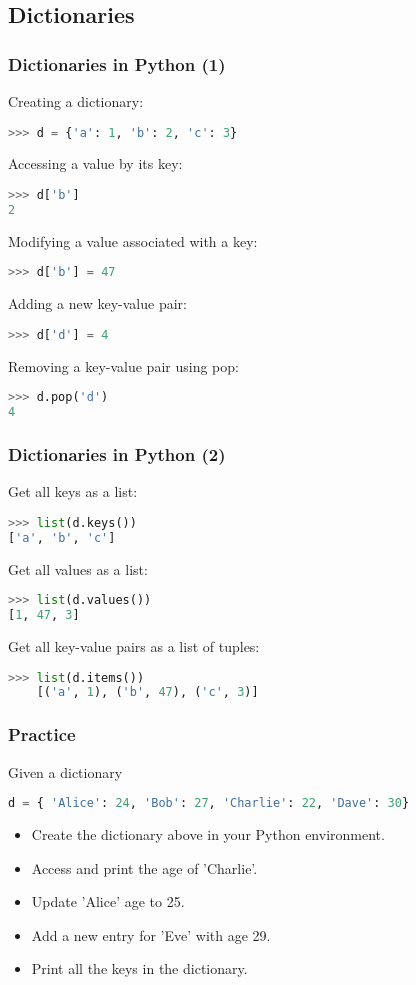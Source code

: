 \subsection{Dictionaries}
\begin{frame}[fragile]
  \frametitle{Dictionaries in Python (1)}
  Creating a dictionary:
  \begin{lstlisting}[language=Python,numbers=none]
>>> d = {'a': 1, 'b': 2, 'c': 3}
  \end{lstlisting}\pause
  Accessing a value by its key:
  \begin{lstlisting}[language=Python,numbers=none]
>>> d['b']
2
  \end{lstlisting}\pause
  Modifying a value associated with a key:
  \begin{lstlisting}[language=Python,numbers=none]
>>> d['b'] = 47
  \end{lstlisting}\pause
  Adding a new key-value pair:
  \begin{lstlisting}[language=Python,numbers=none]
>>> d['d'] = 4
  \end{lstlisting}\pause
  Removing a key-value pair using pop:
  \begin{lstlisting}[language=Python,numbers=none]
>>> d.pop('d')
4
  \end{lstlisting}
\end{frame}

\begin{frame}[fragile]
  \frametitle{Dictionaries in Python (2)}
  Get all keys as a list:
  \begin{lstlisting}[language=Python,numbers=none]
>>> list(d.keys())
['a', 'b', 'c']
  \end{lstlisting}\pause
  Get all values as a list:
  \begin{lstlisting}[language=Python,numbers=none]
>>> list(d.values())
[1, 47, 3]
  \end{lstlisting}\pause
  Get all key-value pairs as a list of tuples:
  \begin{lstlisting}[language=Python,numbers=none]
    >>> list(d.items())
    [('a', 1), ('b', 47), ('c', 3)]
  \end{lstlisting}
\end{frame}

\begin{frame}[fragile]
  \frametitle{Practice}
  Given a dictionary
  \begin{lstlisting}[language=Python,numbers=none]
d = { 'Alice': 24, 'Bob': 27, 'Charlie': 22, 'Dave': 30}
  \end{lstlisting}
  \begin{itemize}
   \item Create the dictionary above in your Python environment.\pause
   \item Access and print the age of 'Charlie'.\pause
   \item Update 'Alice' age to 25.\pause
   \item Add a new entry for 'Eve' with age 29.\pause
   \item Print all the keys in the dictionary.
  \end{itemize}
 \end{frame}

